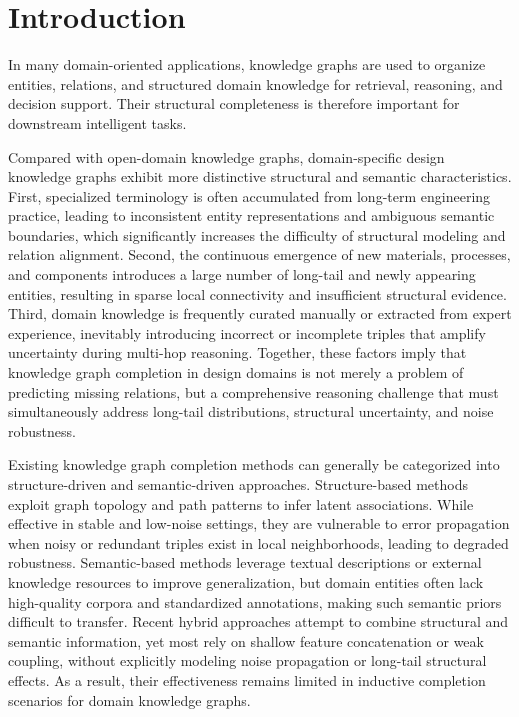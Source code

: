 \documentclass[preprint,12pt]{elsarticle}
\begin{document}
\section{Introduction}

In many domain-oriented applications, knowledge graphs are used to organize entities, relations, and structured domain knowledge for retrieval, reasoning, and decision support. Their structural completeness is therefore important for downstream intelligent tasks.

Compared with open-domain knowledge graphs, domain-specific design knowledge graphs exhibit more distinctive structural and semantic characteristics. First, specialized terminology is often accumulated from long-term engineering practice, leading to inconsistent entity representations and ambiguous semantic boundaries, which significantly increases the difficulty of structural modeling and relation alignment. Second, the continuous emergence of new materials, processes, and components introduces a large number of long-tail and newly appearing entities, resulting in sparse local connectivity and insufficient structural evidence. Third, domain knowledge is frequently curated manually or extracted from expert experience, inevitably introducing incorrect or incomplete triples that amplify uncertainty during multi-hop reasoning. Together, these factors imply that knowledge graph completion in design domains is not merely a problem of predicting missing relations, but a comprehensive reasoning challenge that must simultaneously address long-tail distributions, structural uncertainty, and noise robustness.

Existing knowledge graph completion methods can generally be categorized into structure-driven and semantic-driven approaches. Structure-based methods exploit graph topology and path patterns to infer latent associations. While effective in stable and low-noise settings, they are vulnerable to error propagation when noisy or redundant triples exist in local neighborhoods, leading to degraded robustness. Semantic-based methods leverage textual descriptions or external knowledge resources to improve generalization, but domain entities often lack high-quality corpora and standardized annotations, making such semantic priors difficult to transfer. Recent hybrid approaches attempt to combine structural and semantic information, yet most rely on shallow feature concatenation or weak coupling, without explicitly modeling noise propagation or long-tail structural effects. As a result, their effectiveness remains limited in inductive completion scenarios for domain knowledge graphs.
\end{document}
